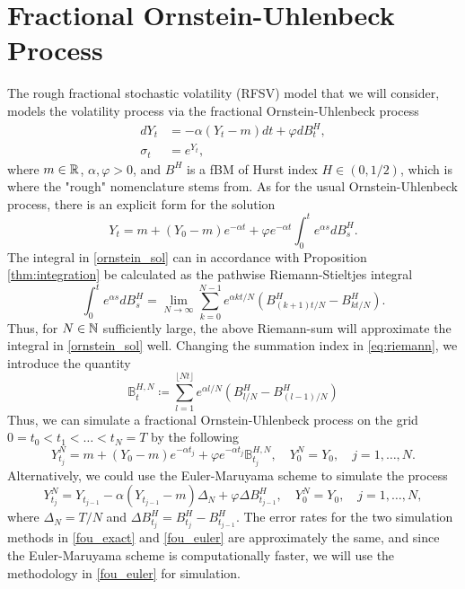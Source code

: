 \section{Fractional Ornstein-Uhlenbeck Process}
The rough fractional stochastic volatility (RFSV) model that we will consider, models the volatility process via the fractional Ornstein-Uhlenbeck process
\begin{align}
    dY_{t}&= -\alpha(Y_{t}-m)dt + \varphi dB^{H}_{t},\\
    \sigma_{t} &= e^{Y_{t}},
\end{align}
where $m \in \mathbb{R}$, $\alpha,\varphi >0$, and $B^{H}$ is a fBM of Hurst index $H\in(0,1/2)$, which is where the "rough" nomenclature stems from. As for the usual Ornstein-Uhlenbeck process, there is an explicit form for the solution
\begin{equation}\label{ornstein_sol}
    Y_{t}= m + (Y_{0}-m)e^{-\alpha t} + \varphi e^{-\alpha t}\int_{0}^{t}e^{\alpha s}dB_{s}^{H}.
\end{equation}
The integral in \eqref{ornstein_sol} can in accordance with Proposition \ref{thm:integration} be calculated as the pathwise Riemann-Stieltjes integral
\begin{equation}\label{eq:riemann}
    \int_{0}^{t}e^{\alpha s}dB_{s}^{H}=\lim_{N\to\infty}\sum_{k=0}^{N-1}e^{\alpha k t/N}\left(B_{(k+1)t/N}^{H}-B_{kt/N}^{H}\right).
\end{equation}
Thus, for $N\in\mathbb{N}$ sufficiently large, the above Riemann-sum will approximate the integral in \eqref{ornstein_sol} well. Changing the summation index in \eqref{eq:riemann}, we introduce the quantity
\begin{equation}
    \mathbb{B}_{t}^{H,N}\coloneqq \sum_{l=1}^{\lfloor Nt\rfloor }e^{\alpha l/N}\left(B^{H}_{l/N}-B^{H}_{(l-1)/N}\right)
\end{equation}
Thus, we can simulate a fractional Ornstein-Uhlenbeck process on the grid $0=t_{0}<t_{1}<\dots<t_{N}=T$ by the following 
\begin{equation}\label{fou_exact}
    Y_{t_{j}}^{N}=m + (Y_{0}-m)e^{-\alpha t_{j}} + \varphi e^{-\alpha t_{j}}\mathbb{B}_{t_{j}}^{H,N},\quad Y_{0}^{N}=Y_{0}, \quad j=1,\dots,N.
\end{equation}
Alternatively, we could use the Euler-Maruyama scheme to simulate the process
\begin{equation}\label{fou_euler}
    Y_{t_{j}}^{N}=Y_{t_{j-1}} -\alpha(Y_{t_{j-1}}-m)\Delta_{N} + \varphi\Delta B_{t_{j-1}}^{H},\quad Y_{0}^{N}=Y_{0},\quad j=1,\dots,N,
\end{equation}
where $\Delta_{N}=T/N$ and $\Delta B_{t_{j}}^{H}=B^{H}_{t_{j}}-B^{H}_{t_{j-1}}$. The error rates for the two simulation methods in \eqref{fou_exact} and \eqref{fou_euler} are approximately the same, and since the Euler-Maruyama scheme is computationally faster, we will use the methodology in \eqref{fou_euler} for simulation.

